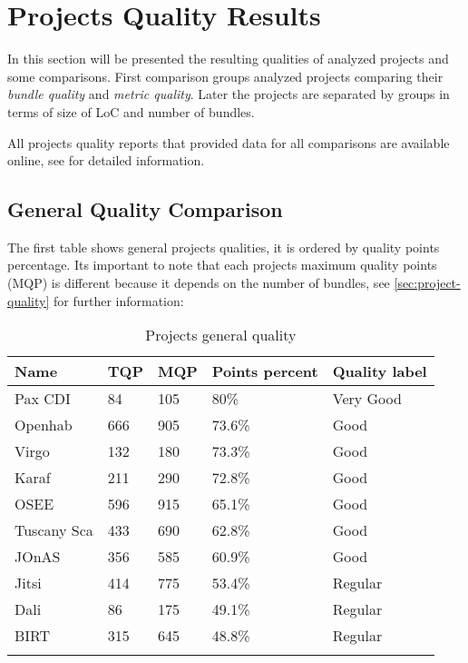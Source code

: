 \section{Projects Quality Results}
In this section will be presented the resulting qualities of analyzed projects and some comparisons. First comparison groups analyzed projects comparing their \emph{bundle quality} and \emph{metric quality}. Later the projects are separated by groups in terms of size of LoC and number of bundles.

All projects quality reports that provided data for all comparisons are available online, see \citep{intrabundle reports 2014} for detailed information. 

\subsection{General Quality Comparison}

The first table shows general projects qualities, it is ordered by quality points percentage. Its important to note that each projects maximum quality points (MQP) is different because it depends on the number of bundles, see \ref{sec:project-quality} for further information:

\begin{table}[h]
\caption{Projects general quality}
\label{projects-general-quality}
    \begin{tabular}{  p{3cm} | p{2cm} | p{2cm} | p{3cm} | p{4cm}}
    \Xhline{2\arrayrulewidth}
    Name & TQP & MQP & Points percent & Quality label \\  \hline
    Pax CDI & 84 & 105 & 80\% & Very Good\\ \hline 
    Openhab & 	666 & 905 & 73.6\% & Good\\ \hline
    Virgo & 132 & 180 & 73.3\% & Good\\ \hline
    Karaf & 211 & 290 & 72.8\% & Good\\ \hline
    OSEE & 596 & 915 & 65.1\% & Good\\ \hline
    Tuscany Sca & 433 & 690 & 62.8\% & Good\\ \hline
    JOnAS & 356 & 585 & 60.9\%  & Good\\ \hline
    Jitsi & 414 & 775 & 53.4\% & Regular\\ \hline
    Dali & 86 & 175 & 49.1\%  & Regular\\ \hline
    BIRT & 315 & 645 & 48.8\% & Regular\\ 
   \Xhline{2\arrayrulewidth}
    \end{tabular}
\end{table}
\FloatBarrier 

